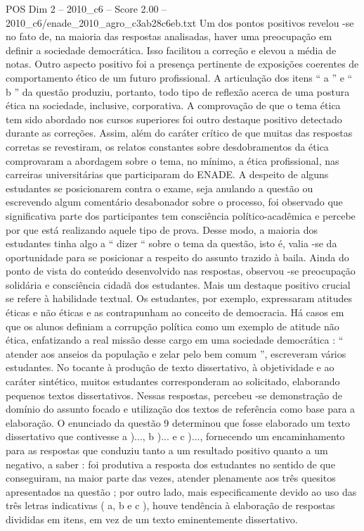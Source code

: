 \begin{textsample}{POS Dim 2 – 2010\_c6 – Score 2.00 – 2010\_c6/enade\_2010\_agro\_c3ab28c6eb.txt}
Um dos pontos positivos revelou -se no fato de, na maioria das respostas analisadas, haver uma preocupação em definir a sociedade democrática.
Isso facilitou a correção e elevou a média de notas.
Outro aspecto positivo foi a presença pertinente de exposições coerentes de comportamento ético de um futuro profissional.
A articulação dos itens “ a ” e “ b ” da questão produziu, portanto, todo tipo de reflexão acerca de uma postura ética na sociedade, inclusive, corporativa.
A comprovação de que o tema ética tem sido abordado nos cursos superiores foi outro destaque positivo detectado durante as correções.
Assim, além do caráter crítico de que muitas das respostas corretas se revestiram, os relatos constantes sobre desdobramentos da ética comprovaram a abordagem sobre o tema, no mínimo, a ética profissional, nas carreiras universitárias que participaram do ENADE.
A despeito de alguns estudantes se posicionarem contra o exame, seja anulando a questão ou escrevendo algum comentário desabonador sobre o processo, foi observado que significativa parte dos participantes tem consciência político-acadêmica e percebe por que está realizando aquele tipo de prova.
Desse modo, a maioria dos estudantes tinha algo a “ dizer “ sobre o tema da questão, isto é, valia -se da oportunidade para se posicionar a respeito do assunto trazido à baila.
Ainda do ponto de vista do conteúdo desenvolvido nas respostas, observou -se preocupação solidária e consciência cidadã dos estudantes.
Mais um destaque positivo crucial se refere à habilidade textual.
Os estudantes, por exemplo, expressaram atitudes éticas e não éticas e as contrapunham ao conceito de democracia.
Há casos em que os alunos definiam a corrupção política como um exemplo de atitude não ética, enfatizando a real missão desse cargo em uma sociedade democrática : “ atender aos anseios da população e zelar pelo bem comum ”, escreveram vários estudantes.
No tocante à produção de texto dissertativo, à objetividade e ao caráter sintético, muitos estudantes corresponderam ao solicitado, elaborando pequenos textos dissertativos.
Nessas respostas, percebeu -se demonstração de domínio do assunto focado e utilização dos textos de referência como base para a elaboração.
O enunciado da questão 9 determinou que fosse elaborado um texto dissertativo que contivesse a )..., b )... e c )..., fornecendo um encaminhamento para as respostas que conduziu tanto a um resultado positivo quanto a um negativo, a saber : foi produtiva a resposta dos estudantes no sentido de que conseguiram, na maior parte das vezes, atender plenamente aos três quesitos apresentados na questão ; por outro lado, mais especificamente devido ao uso das três letras indicativas ( a, b e c ), houve tendência à elaboração de respostas divididas em itens, em vez de um texto eminentemente dissertativo.

\end{textsample}
